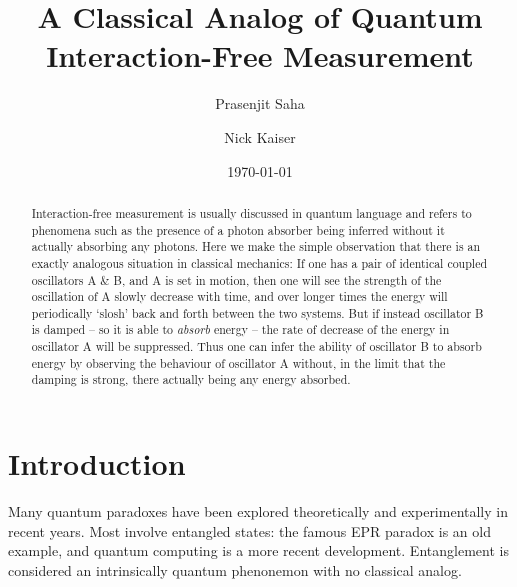 \documentclass[12pt,aps,prb,preprint]{revtex4}
\begin{document}
\title{A Classical Analog of Quantum Interaction-Free Measurement}

\author{Prasenjit Saha}
\author{Nick Kaiser}

\date{\today}

\begin{abstract}
Interaction-free measurement is usually discussed in quantum language and
refers to phenomena such as the presence of a photon absorber being
inferred without it actually absorbing any photons.  Here we make the
simple observation that there is an
exactly analogous situation in classical mechanics: If one has
a pair of identical coupled oscillators A \& B, and A is set in motion,
then one will see the strength of the oscillation of A slowly decrease
with time, and over longer times the energy will periodically `slosh' back
and forth between the two systems.  But if instead oscillator B is damped -- so
it is able to {\em absorb\/} energy -- the rate of decrease of the
energy in oscillator A will be suppressed.   
Thus one can infer the ability of oscillator B to 
absorb energy by observing the behaviour of oscillator A without, in
the limit that the damping is strong, there actually being any
energy absorbed.
\end{abstract}

\maketitle

\section{Introduction}

Many quantum paradoxes have been explored theoretically and
experimentally in recent years.  Most involve entangled states: the
famous EPR paradox is an old example, and quantum computing is a more
recent development\cite{2007qucosc.book}.  Entanglement is considered
an intrinsically quantum phenonemon with no classical analog.
\end{document}
